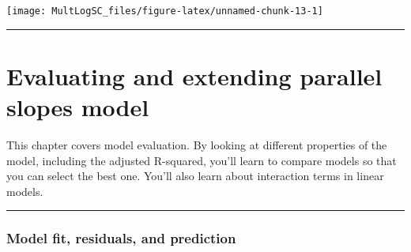 \documentclass[
]{book}
\newenvironment{Shaded}{\begin{snugshade}}{\end{snugshade}}
\newcommand{\DataTypeTok}[1]{\textcolor[rgb]{0.13,0.29,0.53}{#1}}
\newcommand{\KeywordTok}[1]{\textcolor[rgb]{0.13,0.29,0.53}{\textbf{#1}}}
\newcommand{\NormalTok}[1]{#1}
\newcommand{\OperatorTok}[1]{\textcolor[rgb]{0.81,0.36,0.00}{\textbf{#1}}}
\newcommand{\OtherTok}[1]{\textcolor[rgb]{0.56,0.35,0.01}{#1}}
\newcommand{\StringTok}[1]{\textcolor[rgb]{0.31,0.60,0.02}{#1}}
\begin{document}
\begin{Shaded}
\end{Shaded}

\begin{center}\texttt{[image: MultLogSC\_files/figure-latex/unnamed-chunk-13-1]} \end{center}

\begin{center}\rule{0.5\linewidth}{0.5pt}\end{center}

\hypertarget{evaluating-and-extending-parallel-slopes-model}{%
\chapter{Evaluating and extending parallel slopes model}\label{evaluating-and-extending-parallel-slopes-model}}

This chapter covers model evaluation. By looking at different properties of the model, including the adjusted R-squared, you'll learn to compare models so that you can select the best one. You'll also learn about interaction terms in linear models.

\begin{center}\rule{0.5\linewidth}{0.5pt}\end{center}

\hypertarget{model-fit-residuals-and-prediction}{%
\subsection*{Model fit, residuals, and prediction}\label{model-fit-residuals-and-prediction}}
\end{document}
